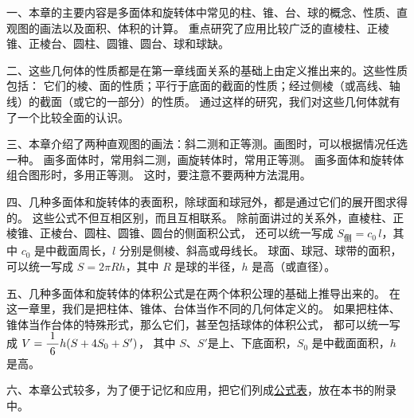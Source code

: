 \xiaojie

一、本章的主要内容是多面体和旋转体中常见的柱、锥、台、球的概念、性质、直观图的画法以及面积、体积的计算。
重点研究了应用比较广泛的直棱柱、正棱锥、正棱台、圆柱、圆锥、圆台、球和球缺。


二、这些几何体的性质都是在第一章线面关系的基础上由定义推出来的。这些性质包括：
它们的棱、面的性质；平行于底面的截面的性质；经过侧棱（或高线、轴线）的截面（或它的一部分）的性质。
通过这样的研究，我们对这些几何体就有了一个比较全面的认识。


三、本章介绍了两种直观图的画法：斜二测和正等测。画图时，可以根据情况任选一种。
画多面体时，常用斜二测，画旋转体时，常用正等测。 画多面体和旋转体组合图形时，多用正等测。
这时，要注意不要两种方法混用。


四、几种多面体和旋转体的表面积，除球面和球冠外，都是通过它们的展开图求得的。
这些公式不但互相区别，而且互相联系。
除前面讲过的关系外，直棱柱、正棱锥、正棱台、圆柱、圆锥、圆台的侧面积公式，
还可以统一写成 $S_\text{侧} = c_0 \, l$，其中 $c_0$ 是中截面周长，$l$ 分别是侧棱、斜高或母线长。
球面、球冠、球带的面积，可以统一写成 $S = 2 \pi Rh$，其中 $R$ 是球的半径，$h$ 是高（或直径）。

\begin{enhancedline}
五、几种多面体和旋转体的体积公式是在两个体积公理的基础上推导出来的。
在这一章里，我们是把柱体、锥体、台体当作不同的几何体定义的。
如果把柱体、锥体当作台体的特殊形式，那么它们，甚至包括球体的体积公式，
都可以统一写成 $V = \dfrac{\; 1 \;}{6} h (S + 4S_0 + S')$，
其中 $S$、$S'$是上、下底面积，$S_0$ 是中截面面积，$h$ 是高。
\end{enhancedline}


六、本章公式较多，为了便于记忆和应用，把它们列成\hyperref[ch:gongshibiao]{公式表}，放在本书的附录中。


